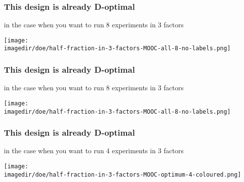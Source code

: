 \begin{frame}\frametitle{\color{white}This design is already D-optimal}
	\color{white} in the case when you want to run 8 experiments in 3 factors
	\centerline{\texttt{[image: \\imagedir/doe/half-fraction-in-3-factors-MOOC-all-8-no-labels.png]}}	
\end{frame}

\begin{frame}\frametitle{This design is already D-optimal}
	\color{myOrange} in the case when you want to run 8 experiments in 3 factors
	\centerline{\texttt{[image: \\imagedir/doe/half-fraction-in-3-factors-MOOC-all-8-no-labels.png]}}	
\end{frame}

\begin{frame}\frametitle{This design is already D-optimal}
	\color{myOrange} in the case when you want to run 4 experiments in 3 factors
	\centerline{\texttt{[image: \\imagedir/doe/half-fraction-in-3-factors-MOOC-optimum-4-coloured.png]}}	
\end{frame}



